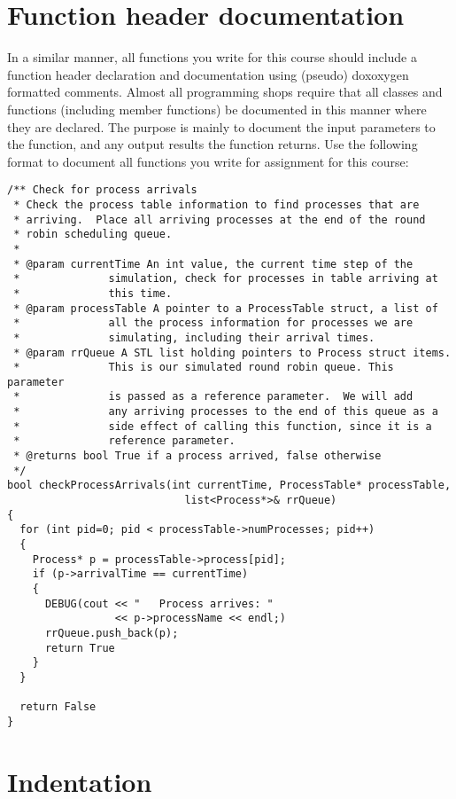 \documentclass[11pt]{article}
\begin{document}
\section*{Function header documentation}
\label{sec-3}


In a similar manner, all functions you write for this course should
include a function header declaration and documentation using (pseudo)
doxoxygen formatted comments.  Almost all programming shops require
that all classes and functions (including member functions) be
documented in this manner where they are declared.  The purpose is
mainly to document the input parameters to the function, and any
output results the function returns.  Use the following format to
document all functions you write for assignment for this course:


\begin{verbatim}
/** Check for process arrivals
 * Check the process table information to find processes that are
 * arriving.  Place all arriving processes at the end of the round
 * robin scheduling queue.
 *
 * @param currentTime An int value, the current time step of the
 *              simulation, check for processes in table arriving at
 *              this time.
 * @param processTable A pointer to a ProcessTable struct, a list of
 *              all the process information for processes we are
 *              simulating, including their arrival times.
 * @param rrQueue A STL list holding pointers to Process struct items.
 *              This is our simulated round robin queue. This parameter
 *              is passed as a reference parameter.  We will add
 *              any arriving processes to the end of this queue as a
 *              side effect of calling this function, since it is a
 *              reference parameter.
 * @returns bool True if a process arrived, false otherwise 
 */
bool checkProcessArrivals(int currentTime, ProcessTable* processTable, 
                            list<Process*>& rrQueue)
{
  for (int pid=0; pid < processTable->numProcesses; pid++)
  {
    Process* p = processTable->process[pid];
    if (p->arrivalTime == currentTime)
    {
      DEBUG(cout << "   Process arrives: " 
                 << p->processName << endl;)
      rrQueue.push_back(p);
      return True
    }
  }

  return False
}
\end{verbatim}
\section*{Indentation}
\label{sec-4}
\end{document}
